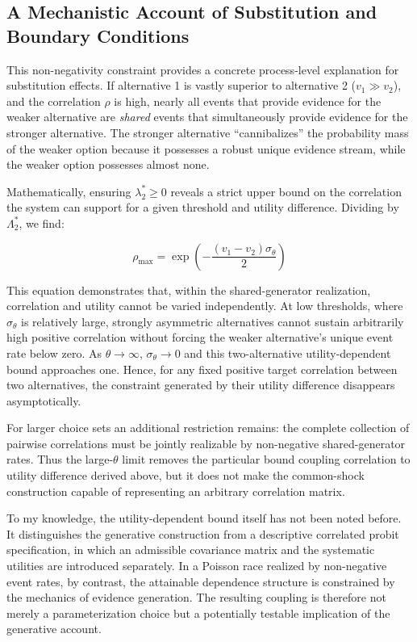 \documentclass[
  man,
  floatsintext,
  longtable,
  a4paper,
  nolmodern,
  notxfonts,
  notimes,
  colorlinks=true,linkcolor=blue,citecolor=blue,urlcolor=blue]{apa7}
\newcounter{none} %
\begin{document}
\subsection{A Mechanistic Account of Substitution and Boundary
Conditions}\label{a-mechanistic-account-of-substitution-and-boundary-conditions}

This non-negativity constraint provides a concrete process-level
explanation for substitution effects. If alternative 1 is vastly
superior to alternative 2 (\(v_1 \gg v_2\)), and the correlation
\(\rho\) is high, nearly all events that provide evidence for the weaker
alternative are \emph{shared} events that simultaneously provide
evidence for the stronger alternative. The stronger alternative
``cannibalizes'' the probability mass of the weaker option because it
possesses a robust unique evidence stream, while the weaker option
possesses almost none.

Mathematically, ensuring \(\lambda_2^* \ge 0\) reveals a strict upper
bound on the correlation the system can support for a given threshold
and utility difference. Dividing by \(\Lambda_2^*\), we find:

\[\rho_{\max} = \exp\left(-\frac{(v_1 - v_2) \sigma_\theta}{2}\right)\]

This equation demonstrates that, within the shared-generator
realization, correlation and utility cannot be varied independently. At
low thresholds, where \(\sigma_\theta\) is relatively large, strongly
asymmetric alternatives cannot sustain arbitrarily high positive
correlation without forcing the weaker alternative's unique event rate
below zero. As \(\theta \to \infty\), \(\sigma_\theta \to 0\) and this
two-alternative utility-dependent bound approaches one. Hence, for any
fixed positive target correlation between two alternatives, the
constraint generated by their utility difference disappears
asymptotically.

For larger choice sets an additional restriction remains: the complete
collection of pairwise correlations must be jointly realizable by
non-negative shared-generator rates. Thus the large-\(\theta\) limit
removes the particular bound coupling correlation to utility difference
derived above, but it does not make the common-shock construction
capable of representing an arbitrary correlation matrix.

To my knowledge, the utility-dependent bound itself has not been noted
before. It distinguishes the generative construction from a descriptive
correlated probit specification, in which an admissible covariance
matrix and the systematic utilities are introduced separately. In a
Poisson race realized by non-negative event rates, by contrast, the
attainable dependence structure is constrained by the mechanics of
evidence generation. The resulting coupling is therefore not merely a
parameterization choice but a potentially testable implication of the
generative account.
\end{document}
